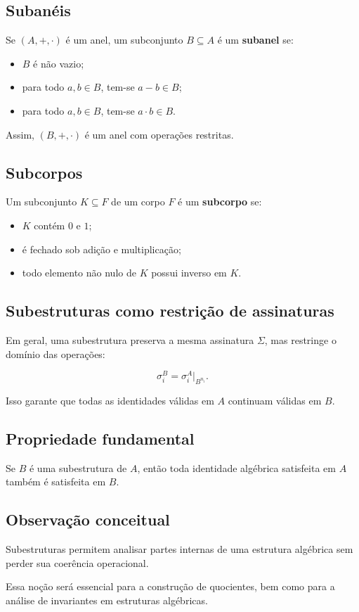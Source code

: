 \documentclass[../../main]{subfiles}
\begin{document}
\subsection{Subanéis}

Se $(A,+,\cdot)$ é um anel, um subconjunto $B \subseteq A$ é um \textbf{subanel} se:

\begin{itemize}
	\item $B$ é não vazio;
	\item para todo $a,b \in B$, tem-se $a-b \in B$;
	\item para todo $a,b \in B$, tem-se $a \cdot b \in B$.
\end{itemize}

Assim, $(B,+,\cdot)$ é um anel com operações restritas.

\subsection{Subcorpos}

Um subconjunto $K \subseteq F$ de um corpo $F$ é um \textbf{subcorpo} se:

\begin{itemize}
	\item $K$ contém $0$ e $1$;
	\item é fechado sob adição e multiplicação;
	\item todo elemento não nulo de $K$ possui inverso em $K$.
\end{itemize}

\subsection{Subestruturas como restrição de assinaturas}

Em geral, uma subestrutura preserva a mesma assinatura $\Sigma$, mas restringe o domínio das operações:

\[
	\sigma_i^B = \sigma_i^A|_{B^{n_i}}.
\]

Isso garante que todas as identidades válidas em $A$ continuam válidas em $B$.

\subsection{Propriedade fundamental}

Se $B$ é uma subestrutura de $A$, então toda identidade algébrica satisfeita em $A$ também é satisfeita em $B$.

\subsection{Observação conceitual}

Subestruturas permitem analisar partes internas de uma estrutura algébrica sem perder sua coerência operacional.

Essa noção será essencial para a construção de quocientes, bem como para a análise de invariantes em estruturas algébricas.
\end{document}
